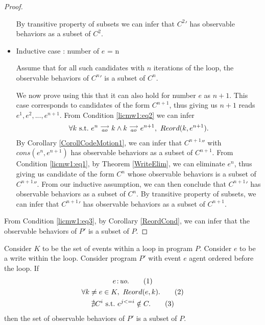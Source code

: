 \begin{proof}
\begin{itemize}
        By transitive property of subsets we can infer that $C^{2}'$ has observable behaviors as a subset of $C^2$.
        
        \item Inductive case : number of $e$ = n

        Assume that for all such candidates with $n$ iterations of the loop, the observable behaviors of $C^{n}'$ is a subset of $C^n$.

        We now prove using this that it can also hold for number $e$ as $n + 1$. 
        This case corresponds to candidates of the form $C^{n+1}$, thus giving us $n+1$ reads $e^1, e^2,...,e^{n+1}$.
        From Condition \ref{licmw1:eq2} we can infer 
        \begin{align*}
            \forall k \ \text{s.t.} \ e^n\stackrel{\longrightarrow}{_{ao}}k \wedge k\stackrel{\longrightarrow}{_{ao}}e^{n+1}, \ Reord(k,e^{n+1}).
        \end{align*}
        By Corollary \ref{CorollCodeMotion1}, we can infer that $C^{n+1}''$ with $cons(e^n, e^{n+1})$ has observable behaviors as a subset of $C^{n+1}$. 
        From Condition \ref{licmw1:eq1}, by Theorem \ref{WriteElim}, we can eliminate $e^{n}$, thus giving us candidate of the form $C^n$ whose observable behaviors is a subset of $C^{n+1}''$.
        From our inductive assumption, we can then conclude that $C^{n+1}'$ has observable behaviors as a subset of $C^n$. 
        By transitive property of subsets, we can infer that $C^{n+1}'$ has observable behaviors as a subset of $C^{n+1}$.

    \end{itemize}

    From Condition \ref{licmw1:eq3}, by Corollary \ref{ReordCond}, we can infer that the observable behaviors of $P'$ is a subset of $P$.

\end{proof}


\begin{corollary}
    \label{LoopInvCodeMotWrite2}
    Consider $K$ to be the set of events within a loop in program $P$. 
    Consider $e$ to be a write within the loop. 
    Consider program $P'$ with event $e$ agent ordered before the loop. 
    If
    \begin{gather*}
        e\!:\!\textit{uo}. \tag{1} \label{licmw2:eq1}\\
        \forall k \neq e \in K, \ Reord(e, k). \tag{2} \label{licmw2:eq2}\\ 
        \nexists C^i \ \text{s.t.} \ e^{j<=i} \notin C. \tag{3} \label{licmw2:eq3}                    
    \end{gather*}
    then the set of observable behaviors of $P'$ is a subset of $P$.

\end{corollary}             

